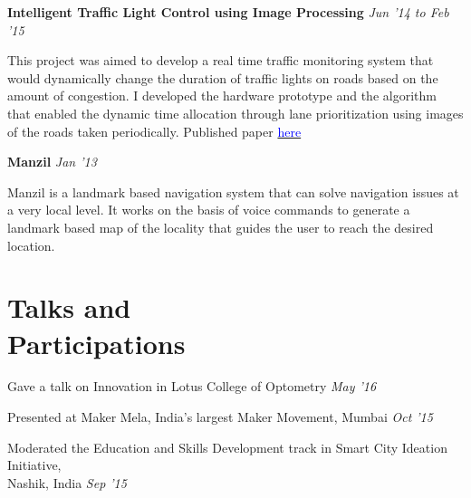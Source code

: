 \documentclass[margin,line]{res}
\newenvironment{list1}{
  \begin{list}{\ding{113}}{%
      \setlength{\itemsep}{0in}
      \setlength{\parsep}{0in} \setlength{\parskip}{0in}
      \setlength{\topsep}{0in} \setlength{\partopsep}{0in}
      \setlength{\leftmargin}{0.17in}}}{\end{list}}
\begin{document}
\begin{resume}
\vspace*{-0.1in}

{\bf Intelligent Traffic Light Control using Image Processing} \hfill {\textit{Jun '14 to Feb '15}} \\
\vspace*{-.15in}
\begin{list1}
\item[]This project was aimed to develop a real time traffic monitoring system that would dynamically change the duration of traffic lights on roads based on the amount of congestion. I developed the hardware prototype and the algorithm that enabled the dynamic time allocation through lane prioritization using images of the roads taken periodically.
Published paper \href{http://iraj.in/up_proc/pdf/129-14265951081-3.pdf}{\textcolor{blue}{here}}
\end{list1}

\vspace*{-0.1in}

{\bf Manzil} \hfill {\textit{Jan '13}} \\
\vspace*{-.15in}
\begin{list1}
\item[]
Manzil is a landmark based navigation system that can solve navigation issues at a very local level. It works on the basis of voice commands to generate a landmark based map of the locality that guides the user to reach the desired location.
\end{list1}

\section{\sc Talks and \\ Participations}
{Gave a talk on Innovation in Lotus College of Optometry} \hfill {\textit{May '16}}

\vspace*{-0.1in}

{Presented at Maker Mela, India's largest Maker Movement, Mumbai} \hfill {\textit{Oct '15}}

\vspace*{-0.1in}

{Moderated the Education and Skills Development track in Smart City Ideation Initiative,\\ Nashik, India} \hfill {\textit{Sep '15}}

\vspace*{-0.1in}


\end{resume}
\end{document}
